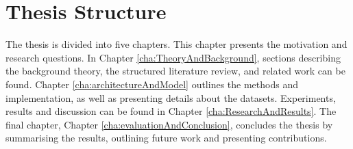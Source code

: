 \section{Thesis Structure}
\label{sec:thesisStructure}
The thesis is divided into five chapters. This chapter presents the motivation and research questions. In Chapter \ref{cha:TheoryAndBackground}, sections describing the background theory, the structured literature review, and related work can be found. Chapter \ref{cha:architectureAndModel} outlines the methods and implementation, as well as presenting details about the datasets. Experiments, results and discussion can be found in Chapter \ref{cha:ResearchAndResults}. The final chapter, Chapter \ref{cha:evaluationAndConclusion}, concludes the thesis by summarising the results, outlining future work and presenting contributions.